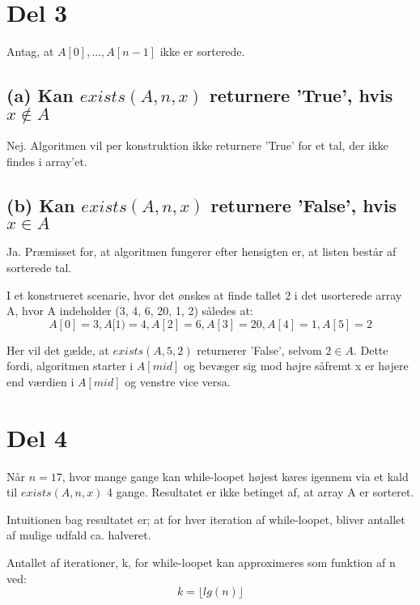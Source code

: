 \documentclass[11pt,a4paper,final]{article}
\begin{document}
\clearpage

\section*{Del 3}
Antag, at $A[0],...,A[n-1]$ ikke er sorterede. 

\subsection*{(a) Kan $exists(A, n, x)$ returnere 'True', hvis $x {\not\in} A$}
Nej. Algoritmen vil per konstruktion ikke returnere 'True' for et tal, der ikke findes i array'et.

\subsection*{(b) Kan $exists(A, n, x)$ returnere 'False', hvis $x {\in} A$}
Ja. Præmisset for, at algoritmen fungerer efter hensigten er, at listen består af sorterede tal. 

I et konstrueret scenarie, hvor det ønskes at finde tallet 2 i det usorterede array A, hvor A indeholder (3, 4, 6, 20, 1, 2) således at:
\[A[0]=3, A[1) = 4, A[2] = 6, A[3] = 20, A[4] = 1, A[5] = 2\]

Her vil det gælde, at $exists(A, 5, 2)$ returnerer 'False', selvom $2 {\in} A$. Dette fordi, algoritmen starter i $A[mid]$ og bevæger sig mod højre såfremt x er højere end værdien i $A[mid]$ og venstre vice versa. 

\section*{Del 4}
Når $n=17$, hvor mange gange kan while-loopet højest køres igennem via et kald til $exists(A, n, x)$ 4 gange. Resultatet er ikke betinget af, at array A er sorteret. 

Intuitionen bag resultatet er; at for hver iteration af while-loopet, bliver antallet af mulige udfald ca. halveret. 

Antallet af iterationer, k, for while-loopet kan approximeres som funktion af n ved:
$$
k = \lfloor{lg(n)} \rfloor
$$
\end{document}
